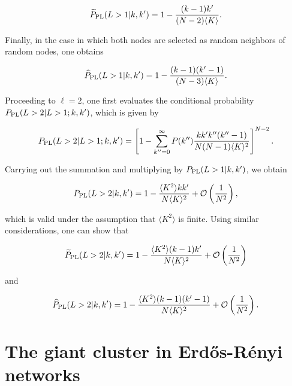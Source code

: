 \documentclass[preprint,pre,superscriptaddress,showpacs]{revtex4}
\begin{document}
\begin{equation}
\widetilde P_{\rm PL}(L>1 | k,k') = 1 - \frac{(k-1) k'}{(N-2) \langle K \rangle}.
\end{equation}

\noindent
Finally, in the case in which both nodes are selected as random neighbors
of random nodes, one obtains

\begin{equation}
\widehat P_{\rm PL}(L>1 | k,k') = 1 - \frac{(k-1) (k'-1)}{(N-3) \langle K \rangle}.
\end{equation}

\noindent
Proceeding to $\ell=2$, one first evaluates the conditional probability 
$P_{\rm PL}(L>2 | L>1;k,k')$, which is given by

\begin{equation}
P_{\rm PL}(L>2 | L>1; k,k') =
\left[ 1 - \sum_{k''=0}^{\infty}
P(k'') \frac{k k' k''(k''-1)}{N(N-1) \langle K \rangle^2}
\right]^{N-2}.
\end{equation}

\noindent
Carrying out the summation and multiplying by
$P_{\rm PL}(L>1| k,k')$, we obtain

\begin{equation}
P_{\rm PL}(L>2 | k, k') = 
1 - \frac{\langle K^2 \rangle k k'}{N \langle K \rangle^2}
+ \mathcal{O} \left( \frac{1}{N^2} \right),
\end{equation}

\noindent
which is valid under the assumption that $\langle K^2 \rangle$
is finite.
Using similar considerations, one can show that

\begin{equation}
\widetilde P_{\rm PL}(L>2 | k, k') = 
1 - \frac{\langle K^2 \rangle (k-1) k'}{N \langle K \rangle^2}
+ \mathcal{O} \left( \frac{1}{N^2} \right)
\end{equation}

\noindent
and

\begin{equation}
\widehat P_{\rm PL}(L>2 | k, k') = 
1 - \frac{\langle K^2 \rangle (k-1) (k'-1)}{N \langle K \rangle^2}
+ \mathcal{O} \left( \frac{1}{N^2} \right).
\end{equation}





\section{The giant cluster in Erd{\H o}s-R\'enyi networks}
\end{document}
